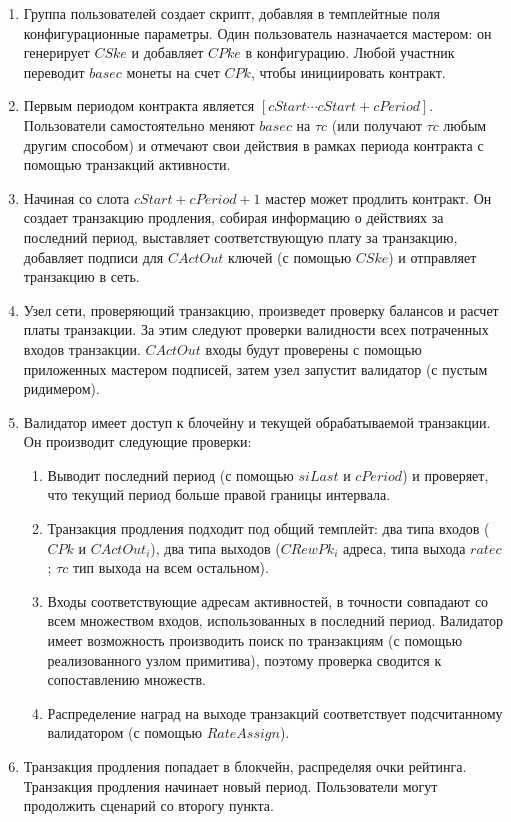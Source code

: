 \documentclass[specification,annotation]{itmo-student-thesis}
\begin{document}
\begin{enumerate}
\item Группа пользователей создает скрипт, добавляя в темплейтные поля
  конфигурационные параметры. Один пользователь назначается мастером:
  он генерирует $CSke$ и добавляет $CPke$ в конфигурацию. Любой
  участник переводит $basec$ монеты на счет $CPk$, чтобы инициировать
  контракт.
\item Первым периодом контракта является $[cStart \cdots
  cStart+cPeriod]$. Пользователи самостоятельно меняют $basec$ на
  $\tau c$ (или получают $\tau c$ любым другим способом) и отмечают
  свои действия в рамках периода контракта с помощью транзакций
  активности.
\item Начиная со слота $cStart + cPeriod + 1$ мастер может продлить
  контракт. Он создает транзакцию продления, собирая информацию о
  действиях за последний период, выставляет соответствующую плату за
  транзакцию, добавляет подписи для $CActOut$ ключей (с помощью
  $CSke$) и отправляет транзакцию в сеть.
\item Узел сети, проверяющий транзакцию, произведет проверку балансов
  и расчет платы транзакции. За этим следуют проверки валидности всех
  потраченных входов транзакции. $CActOut$ входы будут проверены с
  помощью приложенных мастером подписей, затем узел запустит валидатор
  (с пустым ридимером).
\item Валидатор имеет доступ к блочейну и текущей обрабатываемой
  транзакции. Он производит следующие проверки:
  \begin{enumerate}
  \item Выводит последний период (с помощью $siLast$ и $cPeriod$) и
    проверяет, что текущий период больше правой границы интервала.
  \item Транзакция продления подходит под общий темплейт: два типа
    входов ($CPk$ и $CActOut_i$), два типа выходов ($CRewPk_i$ адреса,
    типа выхода $ratec$; $\tau c$ тип выхода на всем остальном).
  \item Входы соответствующие адресам активностей, в точности
    совпадают со всем множеством входов, использованных в последний
    период. Валидатор имеет возможность производить поиск по
    транзакциям (с помощью реализованного узлом примитива), поэтому
    проверка сводится к сопоставлению множеств.
  \item Распределение наград на выходе транзакций соответствует
    подсчитанному валидатором (с помощью $RateAssign$).
  \end{enumerate}
\item Транзакция продления попадает в блокчейн, распределяя очки
  рейтинга. Транзакция продления начинает новый период. Пользователи
  могут продолжить сценарий со второгу пункта.
\end{enumerate}
\end{document}
